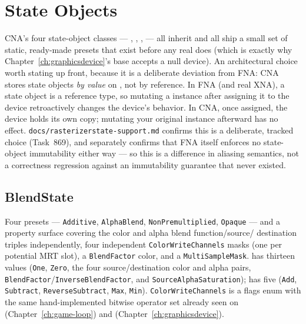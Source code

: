 \chapter{State Objects}
\label{ch:state-objects}

CNA's four state-object classes --- , ,
,  --- all inherit
 and all ship a small set of static, ready-made presets that exist
before any real  does (which is exactly why
Chapter~\ref{ch:graphicsdevice}'s  base accepts a null device).
An architectural choice worth stating up front, because it is a deliberate deviation from
FNA: CNA stores state objects \emph{by value} on , not by
reference. In FNA (and real XNA), a state object is a reference type, so mutating a
 instance after assigning it to the device retroactively changes the
device's behavior. In CNA, once assigned, the device holds its own copy; mutating your
original instance afterward has no effect. \texttt{docs/rasterizerstate-support.md}
confirms this is a deliberate, tracked choice (Task~869), and separately confirms that FNA
itself enforces no state-object immutability either way --- so this is a difference in
aliasing semantics, not a correctness regression against an immutability guarantee that never
existed.

\section{BlendState}

Four presets --- \texttt{Additive}, \texttt{AlphaBlend}, \texttt{NonPremultiplied},
\texttt{Opaque} --- and a property surface covering the color and alpha blend function/source/%
destination triples independently, four independent \texttt{ColorWriteChannels} masks (one
per potential MRT slot), a \texttt{BlendFactor} color, and a \texttt{MultiSampleMask}.
 has thirteen values (\texttt{One}, \texttt{Zero}, the four
source/destination color and alpha pairs, \texttt{BlendFactor}/\texttt{InverseBlendFactor},
and \texttt{SourceAlphaSaturation});  has five (\texttt{Add},
\texttt{Subtract}, \texttt{ReverseSubtract}, \texttt{Max}, \texttt{Min}).
\texttt{ColorWriteChannels} is a flags enum with the same hand-implemented bitwise operator
set already seen on  (Chapter~\ref{ch:game-loop}) and
 (Chapter~\ref{ch:graphicsdevice}).

